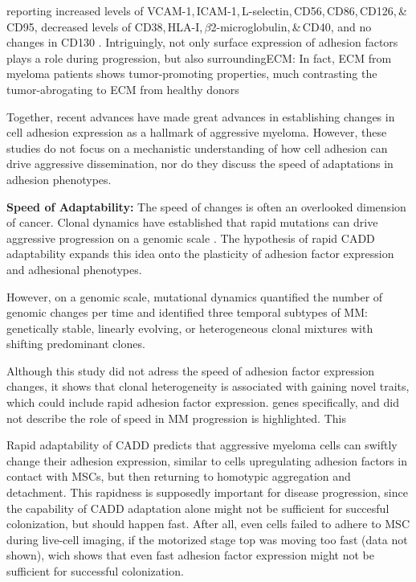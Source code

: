 reporting %
increased levels of VCAM-1,\,ICAM-1,\,L-selectin,\,CD56,\,CD86,\,CD126,\,\&\,CD95, %
decreased levels of CD38,\,HLA-I,\,$\beta$2-microglobulin,\,\&\,CD40, and %
no changes in CD130 %
\cite{terposIncreasedCirculatingVCAM12016, perez-andresClonalPlasmaCells2005}.
Intriguingly, not only surface expression of adhesion factors plays a role
during progression, but also surrounding\ac{ECM}: In fact, \ac{ECM} from myeloma
patients shows tumor-promoting properties, much contrasting the tumor-abrogating
to \ac{ECM} from healthy donors
\cite{ibraheemBMMSCsderivedECMModifies2019}

Together, recent advances have made great advances in establishing changes in
cell adhesion expression as a hallmark of aggressive myeloma. However, these
studies do not focus on a mechanistic understanding of how cell adhesion can
drive aggressive dissemination, nor do they discuss the speed of adaptations in
adhesion phenotypes.

\textbf{Speed of Adaptability:}
The speed of changes is often an overlooked dimension of cancer. Clonal dynamics
have established that rapid mutations can drive aggressive progression on a
genomic scale \citet{keatsClonalCompetitionAlternating2012}. The hypothesis
of rapid \ac{CADD} adaptability expands this idea onto the plasticity of adhesion factor expression and adhesional phenotypes.

However,
on a genomic scale, mutational dynamics
\citet{keatsClonalCompetitionAlternating2012} quantified the number of genomic
changes per time and identified three temporal subtypes of MM: genetically
stable, linearly evolving, or heterogeneous clonal mixtures with shifting
predominant clones.

Although this study did not adress the speed of adhesion
factor expression changes, it shows that clonal heterogeneity is associated with
gaining novel traits, which could include rapid adhesion factor expression.
genes specifically, and did not describe the role of speed in MM progression is
highlighted. This

Rapid adaptability of \ac{CADD} predicts that aggressive myeloma cells can
swiftly change their adhesion expression, similar to \INA cells upregulating
adhesion factors in contact with \acp{MSC}, but then returning to homotypic
aggregation and detachment. This rapidness is supposedly important for disease
progression, since the capability of \ac{CADD} adaptation  alone might not be
sufficient for succesful colonization, but should happen fast. After all, even
\INA cells failed to adhere to \ac{MSC} during live-cell imaging, if the
motorized stage top was moving too fast (data not shown), wich shows that even
fast adhesion factor expression might not be sufficient for successful
colonization.


